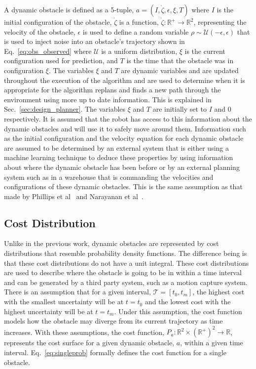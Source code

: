 A dynamic obstacle is defined as a 5-tuple, $a = (I, \dot{\zeta},
\epsilon, \xi, T)$ where $I$ is the initial configuration of the obstacle,
$\dot{\zeta}$ is a function, $\dot{\zeta}: \mathbb{R}^+ \rightarrow
\mathbb{R}^2$, representing the velocity of the obstacle, $\epsilon$ is used to
define a random variable $\rho \sim \mathcal{U}(-\epsilon, \epsilon)$ that is
used to inject noise into an obstacle's trajectory shown in
Eq.~\ref{eq:obs_observed} where $\mathcal{U}$ is a uniform distribution, $\xi$
is the current configuration used for prediction, and $T$ is the time that the
obstacle was in configuration $\xi$.  The variables $\xi$ and $T$ are dynamic
variables and are updated throughout the execution of the algorithm and are
used to determine when it is appropriate for the algorithm replans and finds a
new path through the environment using more up to date information. This is
explained in Sec.~\ref{sec:design_planner}. The variables $\xi$ and $T$ are
initially set to $I$ and $0$ respectively. It is assumed that the robot has
access to this information about the dynamic obstacles and will use it to
safely move around them. Information such as the initial configuration and the
velocity equation for each dynamic obstacle are assumed to be determined by an
external system that is either using a machine learning technique to deduce
these properties by using information about where the dynamic obstacle has been
before or by an external planning system such as in a warehouse that is
commanding the velocities and configurations of these dynamic obstacles. This
is the same assumption as that made by Phillips et al~\cite{sipp} and Narayanan
et al~\cite{asipp}.

\subsection{Cost Distribution}

\label{sec:cost}

Unlike in the previous work, dynamic obstacles are represented by cost
distributions that resemble probability density functions. The difference being
is that these cost distributions do not have a unit integral. These cost
distributions are used to describe where the obstacle is going to be in within
a time interval and can be generated by a third party system, such as a motion
capture system. There is an assumption that for a given interval, $\mathcal{T}
= [t_0, t_m]$, the highest cost with the smallest uncertainty will be at $t =
t_0$ and the lowest cost with the highest uncertainty will be at $t = t_m$.
Under this assumption, the cost function models how the obstacle may diverge
from its current trajectory as time increases. With these assumptions, the cost
function, $P_a: \mathbb{R}^2 \times (\mathbb{R}^+)^2 \rightarrow
\mathbb{R}$, represents the cost surface for a given dynamic obstacle, $a$,
within a given time interval. Eq.~\ref{eq:singleprob} formally defines the cost
function for a single obstacle.

